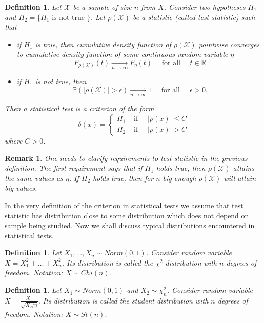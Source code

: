 \documentclass[12pt]{article}
\newtheorem{remark}[theorem]{Remark}
\newtheorem{definition}[theorem]{Definition}
\begin{document}
\begin{definition} Let $\mathscr{X}$ be a sample of size $n$ from $X$. Consider two hypotheses $H_1$ and $H_2=\{H_1\mbox{ is not true }\}$. Let $\rho(\mathscr{X})$ be a statistic (called test statistic) such that
\begin{itemize}
\item if $H_1$ is true, then cumulative density function of $\rho(\mathscr{X})$ pointwise converges to cumulative density function of some continuous random variable $\eta$
$$
F_{\rho(\mathscr{X})}(t)\underset{n\to\infty}{\to}F_{\eta}(t) \quad\mbox{ for all }\quad t\in\mathbb{R}
$$
\item if $H_1$ is not true, then
$$
\mathbb{P}(|\rho(\mathscr{X})|>\epsilon)\underset{n\to\infty}{\to} 1
\quad\mbox{ for all }\quad \epsilon>0.
$$
\end{itemize}
Then a statistical test is a criterion of the form
$$
\delta(x)=
\begin{cases}
H_1 & \mbox{ if }\quad |\rho(x)|\leq C \\
H_2 & \mbox{ if }\quad |\rho(x)|> C
\end{cases}
$$
where $C>0$.
\end{definition}

\begin{remark} One needs to clarify requirements to test statistic in the previous definition. The first requirement says that if $H_1$ holds true, then $\rho(\mathscr{X})$ attains the same values as $\eta$. If $H_2$ holds true, then for $n$ big enough $\rho(\mathscr{X})$ will attain big values.
\end{remark}

In the very definition of the criterion in statistical tests we assume that
test statistic has distribution close to some distribution which does not depend on sample being studied. Now we shall discuss typical distributions encountered in statistical tests.

\begin{definition} Let $X_1,\ldots,X_n\sim Norm(0, 1)$. Consider random variable $X=X_1^2+\ldots+X_n^2$. Its distribution is called the $\chi^2$ distribution with $n$ degrees of freedom. Notation: $X\sim Chi(n)$.  
\end{definition}

\begin{definition} Let $X_1\sim Norm(0, 1)$ and $X_2\sim \chi_n^2$. Consider random variable $X=\frac{X_1}{\sqrt{X_2/n}}$. Its distribution is called the student distribution with $n$ degrees of freedom. Notation: $X\sim St(n)$.  
\end{definition}
\end{document}
